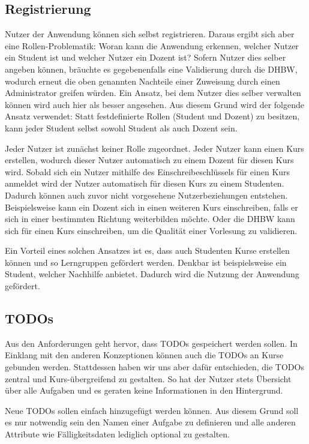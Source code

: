 \subsection{Registrierung}
Nutzer der Anwendung können sich selbst registrieren.
Daraus ergibt sich aber eine Rollen-Problematik: Woran kann die Anwendung erkennen, welcher Nutzer ein Student ist und welcher Nutzer ein Dozent ist?
Sofern Nutzer dies selber angeben können, bräuchte es gegebenenfalls eine Validierung durch die DHBW, wodurch erneut die oben genannten Nachteile einer Zuweisung durch einen Administrator greifen würden.
Ein Ansatz, bei dem Nutzer dies selber verwalten können wird auch hier als besser angesehen.
Aus diesem Grund wird der folgende Ansatz verwendet:
Statt festdefinierte Rollen (Student und Dozent) zu besitzen, kann jeder Student selbst sowohl Student als auch Dozent sein.

Jeder Nutzer ist zunächst keiner Rolle zugeordnet.
Jeder Nutzer kann einen Kurs erstellen, wodurch dieser Nutzer automatisch zu einem Dozent für diesen Kurs wird.
Sobald sich ein Nutzer mithilfe des Einschreibeschlüssels für einen Kurs anmeldet wird der Nutzer automatisch für diesen Kurs zu einem Studenten.
Dadurch können auch zuvor nicht vorgesehene Nutzerbeziehungen entstehen.
Beispielsweise kann ein Dozent sich in einen weiteren Kurs einschreiben, falls er sich in einer bestimmten Richtung weiterbilden möchte.
Oder die DHBW kann sich für einen Kurs einschreiben, um die Qualität einer Vorlesung zu validieren.


Ein Vorteil eines solchen Ansatzes ist es, dass auch Studenten Kurse erstellen können und so Lerngruppen gefördert werden.
Denkbar ist beispielsweise ein Student, welcher Nachhilfe anbietet.
Dadurch wird die Nutzung der Anwendung gefördert.








\subsection{TODOs}
Aus den Anforderungen geht hervor, dass TODOs gespeichert werden sollen. In Einklang mit den anderen Konzeptionen können auch die TODOs an Kurse gebunden werden. Stattdessen haben wir uns aber dafür entschieden, die TODOs zentral und Kurs-übergreifend zu gestalten. So hat der Nutzer stets Übersicht über alle Aufgaben und es geraten keine Informationen in den Hintergrund.

Neue TODOs sollen einfach hinzugefügt werden können. Aus diesem Grund soll es nur notwendig sein den Namen einer Aufgabe zu definieren und alle anderen Attribute wie Fälligkeitsdaten lediglich optional zu gestalten.

